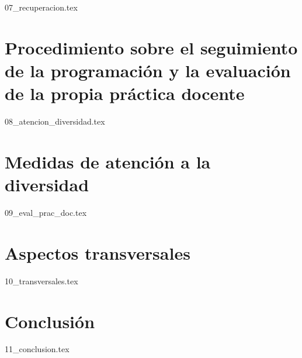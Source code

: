 \documentclass[a4paper,oneside,titlepage,12pt]{article}
\begin{document}
{07_recuperacion.tex}

\section[Seguimiento de la programación y evaluación de la práctica docente]{Procedimiento sobre el seguimiento de la programación y la evaluación de la propia práctica docente}

{08_atencion_diversidad.tex}

\section{Medidas de atención a la diversidad}

{09_eval_prac_doc.tex}

\section{Aspectos transversales}

{10_transversales.tex}

\section{Conclusión}

{11_conclusion.tex}
    
\end{document}

